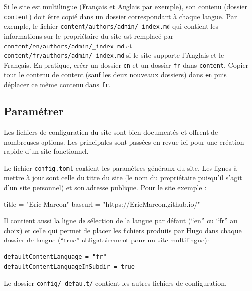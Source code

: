 \documentclass[
  12pt,
  french,
  a4paper,
  extrafontsizes,onecolumn,openright
  ]{memoir}
\newenvironment{Shaded}{\begin{snugshade}}{\end{snugshade}}
\newcommand{\NormalTok}[1]{#1}
\newcommand{\StringTok}[1]{\textcolor[rgb]{0.31,0.60,0.02}{#1}}
\begin{document}
Si le site est multilingue (Français et Anglais par exemple), son contenu (dossier \texttt{content}) doit être copié dans un dossier correspondant à chaque langue.
Par exemple, le fichier \texttt{content/authors/admin/\_index.md} qui contient les informations sur le propriétaire du site est remplacé par \texttt{content/en/authors/admin/\_index.md} et \texttt{content/fr/authors/admin}\break\texttt{/\_index.md} si le site supporte l'Anglais et le Français.
En pratique, créer un dossier \texttt{en} et un dossier \texttt{fr} dans \texttt{content}.
Copier tout le contenu de content (sauf les deux nouveaux dossiers) dans \texttt{en} puis déplacer ce même contenu dans \texttt{fr}.

\hypertarget{paramuxe9trer}{%
\subsection{Paramétrer}\label{paramuxe9trer}}

Les fichiers de configuration du site sont bien documentés et offrent de nombreuses options.
Les principales sont passées en revue ici pour une création rapide d'un site fonctionnel.

Le fichier \texttt{config.toml} contient les paramètres généraux du site.
Les lignes à mettre à jour sont celle du titre du site (le nom du propriétaire puisqu'il s'agit d'un site personnel) et son adresse publique.
Pour le site exemple :

\scriptsize

\begin{Shaded}
\begin{Highlighting}[]
\NormalTok{title =}\StringTok{ "Eric Marcon"}
\NormalTok{baseurl =}\StringTok{ "https://EricMarcon.github.io/"}
\end{Highlighting}
\end{Shaded}

\normalsize

Il contient aussi la ligne de sélection de la langue par défaut (\enquote{en} ou \enquote{fr} au choix) et celle qui permet de placer les fichiers produits par Hugo dans chaque dossier de langue (\enquote{true} obligatoirement pour un site multilingue):

\begin{verbatim}
defaultContentLanguage = "fr"
defaultContentLanguageInSubdir = true
\end{verbatim}

Le dossier \texttt{config/\_default/} contient les autres fichiers de configuration.
\end{document}

